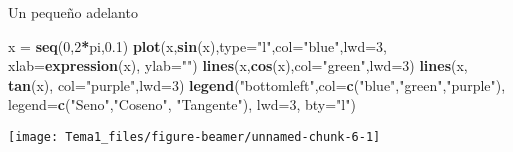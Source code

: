 \documentclass[
  ignorenonframetext,
]{beamer}
\newenvironment{Shaded}{\begin{snugshade}}{\end{snugshade}}
\newcommand{\DataTypeTok}[1]{\textcolor[rgb]{0.13,0.29,0.53}{#1}}
\newcommand{\DecValTok}[1]{\textcolor[rgb]{0.00,0.00,0.81}{#1}}
\newcommand{\FloatTok}[1]{\textcolor[rgb]{0.00,0.00,0.81}{#1}}
\newcommand{\KeywordTok}[1]{\textcolor[rgb]{0.13,0.29,0.53}{\textbf{#1}}}
\newcommand{\NormalTok}[1]{#1}
\newcommand{\OperatorTok}[1]{\textcolor[rgb]{0.81,0.36,0.00}{\textbf{#1}}}
\newcommand{\StringTok}[1]{\textcolor[rgb]{0.31,0.60,0.02}{#1}}
\begin{document}
\begin{frame}[fragile]{Un pequeño adelanto}
\protect\hypertarget{un-pequeuxf1o-adelanto}{}

\begin{Shaded}
\begin{Highlighting}[]
\NormalTok{x =}\StringTok{ }\KeywordTok{seq}\NormalTok{(}\DecValTok{0}\NormalTok{,}\DecValTok{2}\OperatorTok{*}\NormalTok{pi,}\FloatTok{0.1}\NormalTok{)}
\KeywordTok{plot}\NormalTok{(x,}\KeywordTok{sin}\NormalTok{(x),}\DataTypeTok{type=}\StringTok{"l"}\NormalTok{,}\DataTypeTok{col=}\StringTok{"blue"}\NormalTok{,}\DataTypeTok{lwd=}\DecValTok{3}\NormalTok{, }\DataTypeTok{xlab=}\KeywordTok{expression}\NormalTok{(x), }\DataTypeTok{ylab=}\StringTok{""}\NormalTok{)}
\KeywordTok{lines}\NormalTok{(x,}\KeywordTok{cos}\NormalTok{(x),}\DataTypeTok{col=}\StringTok{"green"}\NormalTok{,}\DataTypeTok{lwd=}\DecValTok{3}\NormalTok{)}
\KeywordTok{lines}\NormalTok{(x, }\KeywordTok{tan}\NormalTok{(x), }\DataTypeTok{col=}\StringTok{"purple"}\NormalTok{,}\DataTypeTok{lwd=}\DecValTok{3}\NormalTok{)}
\KeywordTok{legend}\NormalTok{(}\StringTok{"bottomleft"}\NormalTok{,}\DataTypeTok{col=}\KeywordTok{c}\NormalTok{(}\StringTok{"blue"}\NormalTok{,}\StringTok{"green"}\NormalTok{,}\StringTok{"purple"}\NormalTok{),}
     \DataTypeTok{legend=}\KeywordTok{c}\NormalTok{(}\StringTok{"Seno"}\NormalTok{,}\StringTok{"Coseno"}\NormalTok{, }\StringTok{"Tangente"}\NormalTok{), }\DataTypeTok{lwd=}\DecValTok{3}\NormalTok{, }\DataTypeTok{bty=}\StringTok{"l"}\NormalTok{)}
\end{Highlighting}
\end{Shaded}

\begin{center}\texttt{[image: Tema1\_files/figure-beamer/unnamed-chunk-6-1]} \end{center}

\end{frame}
\end{document}
